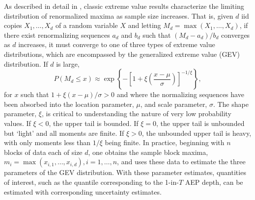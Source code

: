 \documentclass{ametsocV6.1}
\providecommand{\DIFadd}[1]{{\protect\color{blue}\uwave{#1}}} %
\providecommand{\DIFaddbegin}{} %
\providecommand{\DIFaddend}{} %
\newcommand{\DIFaddincludegraphics}[2][]{{\color{blue}\fbox{\DIFOincludegraphics[#1]{#2}}}} %
\DeclareRobustCommand{\DIFaddbegin}{\DIFOaddbegin \let\includegraphics\DIFaddincludegraphics} %
\DeclareRobustCommand{\DIFaddend}{\DIFOaddend \let\includegraphics\DIFOincludegraphics} %
\begin{document}
As described in detail in \citet{coles2001introduction}, classic extreme value results characterize the limiting distribution of renormalized \DIFaddbegin \DIFadd{block }\DIFaddend maxima as sample size increases.
That is, given $d$ iid copies $X_{1}, \ldots, X_{d}$ of a random variable $X$ and letting $M_d = \max(X_1, \ldots, X_d)$, if there exist renormalizing sequences $a_d$ and $b_d$ such that $(M_d - a_d)/b_d$ converges as $d$ increases, it must converge to one of three types of extreme value distributions, which are encompassed by the generalized extreme value (GEV) distribution.
If $d$ is large, 
\begin{equation}
\label{eq:GEV}
P(M_d \leq x) \approx \exp
  \left\{ - \left[1 + \xi \left(\frac{x - \mu}{\sigma}\right) \right]^{-1/\xi} \right\},
\end{equation}
for $x$ such that $1 + \xi (x - \mu)/{\sigma} > 0$ and where the normalizing sequences have been absorbed into the location parameter, $\mu$, and scale parameter, $\sigma$. 
The shape parameter, $\xi$, is critical to understanding the nature of very low probability values.
If $\xi <0$, the upper tail is bounded. %
If $\xi = 0$, the upper tail is unbounded but `light' and all moments are finite.
If $\xi > 0$, the unbounded upper tail is heavy, with only moments less than $1/\xi$ being finite.
In practice, beginning with $n$ blocks of data each of size $d$,  one obtains the sample block maxima, $m_i = \max(x_{i,1}, \ldots, x_{i,d}), i = 1, \ldots, n$, and uses these data to estimate the three parameters of the GEV distribution.
With these parameter estimates, quantities of interest, such as the quantile corresponding to the 1-in-$T$ AEP depth, can be estimated with corresponding uncertainty estimates.
\end{document}

